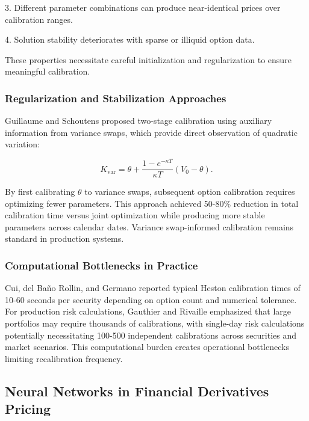 \documentclass[12pt,a4paper]{article}
\begin{document}
3. Different parameter combinations can produce near-identical prices over calibration ranges.

4. Solution stability deteriorates with sparse or illiquid option data.

These properties necessitate careful initialization and regularization to ensure meaningful calibration.

\subsubsection{Regularization and Stabilization Approaches}

Guillaume and Schoutens \cite{GuillaumeSchoutens2013} proposed two-stage calibration using auxiliary information from variance swaps, which provide direct observation of quadratic variation:

\begin{equation}
K_{\text{var}} = \theta + \frac{1 - e^{-\kappa T}}{\kappa T}(V_0 - \theta).
\end{equation}

By first calibrating $\theta$ to variance swaps, subsequent option calibration requires optimizing fewer parameters. This approach achieved 50-80\% reduction in total calibration time versus joint optimization while producing more stable parameters across calendar dates. Variance swap-informed calibration remains standard in production systems.

\subsubsection{Computational Bottlenecks in Practice}

Cui, del Baño Rollin, and Germano \cite{CuiDelBanoRollinGermano2017} reported typical Heston calibration times of 10-60 seconds per security depending on option count and numerical tolerance. For production risk calculations, Gauthier and Rivaille \cite{GauthierRivaille2009} emphasized that large portfolios may require thousands of calibrations, with single-day risk calculations potentially necessitating 100-500 independent calibrations across securities and market scenarios. This computational burden creates operational bottlenecks limiting recalibration frequency.

\subsection{Neural Networks in Financial Derivatives Pricing}
\end{document}
